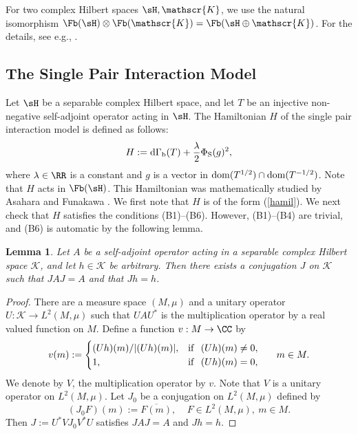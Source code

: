 \documentclass[12pt,draft]{article}
\theoremstyle{plain}
\newtheorem{lem}[theorem]{\bf Lemma}
\numberwithin{equation}{section}
\theoremstyle{remark}
\begin{document}
For two complex Hilbert spaces $\sH,\mathscr{K}$, we use the natural isomorphism
$\Fb(\sH)\otimes\Fb(\mathscr{K})=\Fb(\sH\oplus\mathscr{K})$.
For the details, see e.g., \cite[Section 5.20]{A18}.








\subsection{The Single Pair Interaction Model}\label{pair interaction model}
Let $\sH$ be a separable complex Hilbert space, and let $T$ be an injective non-negative self-adjoint operator acting in $\sH$.
The Hamiltonian $H$ of the single pair interaction model is defined as follows:
\[
H:={\rm d}\Gamma_{\rm b}(T) + \frac{\lambda}{2}\Phi_{\rm S}(g)^2,
\] 
where $\lambda\in\RR$ is a constant and $g$ is a vector in ${\rm dom}(T^{1/2})\cap{\rm dom}(T^{-1/2})$.
Note that $H$ acts in $\Fb(\sH)$.
This Hamiltonian was mathematically studied by Asahara and Funakawa \cite{AF}.
We first note that $H$ is of the form (\ref{hamil}).
We next check that $H$ satisfies the conditions (B1)--(B6).
However, (B1)--(B4) are trivial, and (B6) is automatic by the following lemma.

\begin{lem}\label{conjugation lemma}
Let $A$ be a self-adjoint operator acting in a separable complex Hilbert space $\mathscr{K}$, and let $h\in\mathscr{K}$ be arbitrary.
Then there exists a conjugation $J$ on $\mathscr{K}$ such that $JAJ=A$ and that $Jh=h$.
\end{lem}

\begin{proof}
There are a measure space $(M,\mu)$ and a unitary operator $U:\mathscr{K}\to L^2(M,\mu)$ such that $UAU^*$ is the multiplication operator by a real valued function on $M$. 
Define a function $v:M\to\CC$ by
\[
  v(m) := \begin{cases}
    (Uh)(m)/|(Uh)(m)|, & {\rm if}\ \  (Uh)(m)\not=0, \\
    1, &  {\rm if}\ \ (Uh)(m)=0,
  \end{cases}\ \ \ \ \ m\in M.
\]
We denote by $V$, the multiplication operator by $v$.
Note that $V$ is a unitary operator on $L^2(M,\mu)$.
Let $J_0$ be a conjugation on $L^2(M,\mu)$ defined by
\[
(J_0F)(m) := \overline{F(m)},\ \ \ \ \ F\in L^2(M,\mu),\ m\in M.
\]
Then $J:=U^*VJ_0V^*U$ satisfies $JAJ=A$ and $Jh=h$.
\end{proof}
\end{document}

